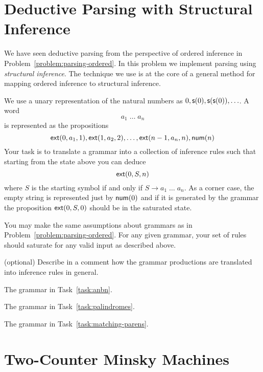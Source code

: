 \documentclass[11pt]{article}
\begin{document}
\section{Deductive Parsing with Structural Inference}

We have seen deductive parsing from the perspective of ordered
inference in Problem~\ref{problem:parsing-ordered}.  In this problem we implement
parsing using \emph{structural inference}.  The technique we
use is at the core of a general method for mapping ordered
inference to structural inference.

We use a unary representation of the natural numbers as
$0, \mathsf{s}(0), \mathsf{s}(\mathsf{s}(0)), \ldots$.  A word
\[
  a_1\; \ldots\; a_n
\]
is represented as the propositions
\[
  \mathsf{ext}(0, a_1, 1), \mathsf{ext}(1, a_2, 2), \ldots, \mathsf{ext}(n-1, a_n, n), \mathsf{num}(n)
\]
Your task is to translate a grammar into a collection of inference
rules such that starting from the state above you can deduce
\[
  \mathsf{ext}(0, S, n)
\]
where $S$ is the starting symbol if and only if
$S \longrightarrow a_1\; \ldots\; a_n$.  As a corner case, the empty
string is represented just by $\mathsf{num}(0)$ and if it is generated by
the grammar the proposition $\mathsf{ext}(0, S, 0)$ should be in the
saturated state.

You may make the same assumptions about grammars as in
Problem~\ref{problem:parsing-ordered}.  For any given grammar, your set
of rules should saturate for any valid input as described above.

\begin{task} (optional)
  Describe in a comment how the grammar productions are translated into inference rules in
  general.
\end{task}

\begin{task}
  The grammar in Task~\ref{task:anbn}.
\end{task}

\begin{task}
  The grammar in Task~\ref{task:palindromes}.
\end{task}

\begin{task}
  The grammar in Task~\ref{task:matching-parens}.
\end{task}

\section{Two-Counter Minsky Machines}
\end{document}
